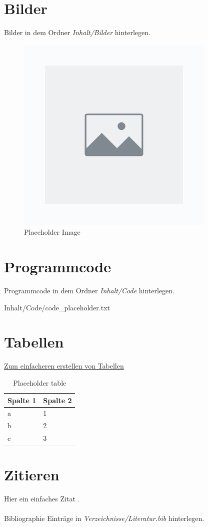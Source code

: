 \section{Bilder}
\label{sec:Bilder}
%
Bilder in dem Ordner \textit{Inhalt/Bilder} hinterlegen.
%
\begin{figure}[htpb]						
    \centering
    \includegraphics[width=.3\textwidth]{Inhalt/Bilder/placeholder_image.png}
    \caption{Placeholder Image}
    \label{fig:placeholder} 
\end{figure}
%
%
\section{Programmcode}
\label{sec:Programmcode}
%
Programmcode in dem Ordner \textit{Inhalt/Code} hinterlegen.
%

    {Inhalt/Code/code_placeholder.txt}
%
%
\section{Tabellen}
\label{sec:Tabellen}
%
\href{https://www.latex-tables.com/}{Zum einfacheren erstellen von Tabellen}
%
\begin{table}[htpb]
    \centering
    \caption{Placeholder table}
    \label{tab:placeholder} 
    \begin{tabular}{ll}
    Spalte 1 & Spalte 2  \\ 
    \hline
    a        & 1         \\
    b        & 2         \\
    c        & 3        
    \end{tabular}
\end{table}
%
%
\section{Zitieren}
\label{sec:Zitieren}
%
Hier ein einfaches Zitat \cite{bibkey}.\\\\
%
Bibliographie Einträge in \textit{Verzeichnisse/Literatur.bib} hinterlegen.
%
%
